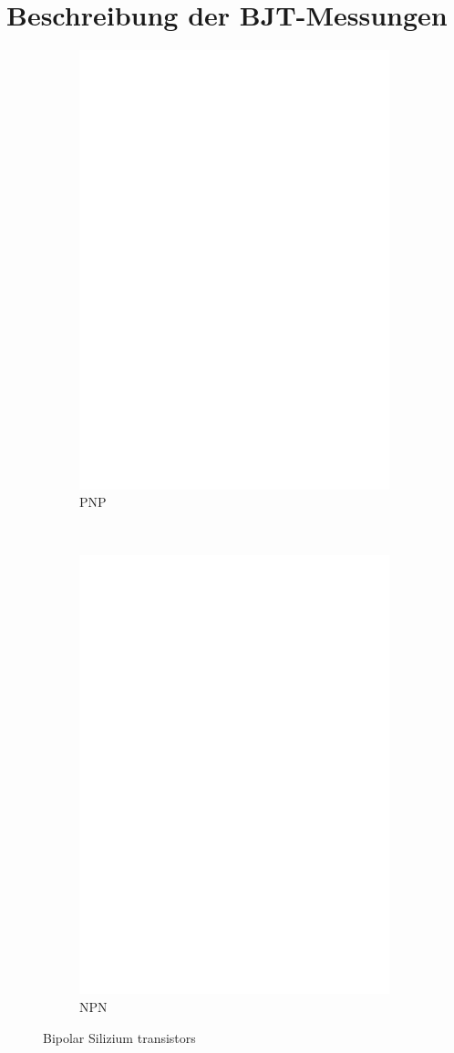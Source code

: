 \chapter{Beschreibung der BJT-Messungen}
\label{sec:BJTmeasurements}

\begin{figure}[H]
  \begin{subfigure}[b]{9cm}
    \centering
    \includegraphics[width=9cm]{../FIG/BJT_BC640.eps}
    \caption{PNP}
    \label{fig:BJT-PNP}
  \end{subfigure}
  ~
  \begin{subfigure}[b]{9cm}
    \centering
    \includegraphics[width=9cm]{../FIG/BJT_BC639.eps}
    \caption{NPN}
    \label{fig:BJT-NPN}
  \end{subfigure}
  \caption{Bipolar Silizium transistors}
\end{figure}


